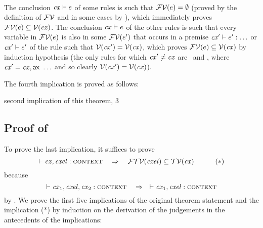 \begin{bycase}
\Case{\Rthsub}
\begin{derivation}
\steP{\efvar{\app{\tspred}{\expr}}=\efvar{\tspred}\cup\efvar{\expr}}
\step{\hastyO{\expr}{\typ}}{\premof{\Rthsub}}
\end{derivation}

\Case{\restrules}\\
The conclusion $\mathit{cx}\vdash e$ of some rules is such that
$\mathcal{FV}(e)=\emptyset$ (proved by the definition of $\mathcal{FV}$ and in some
cases by ), which immediately proves
$\mathcal{FV}(e)\subseteq\mathcal{V}(\mathit{cx})$. The conclusion $\mathit{cx}\vdash e$ of the
other rules is such that every variable in $\mathcal{FV}(e)$ is also in some
$\mathcal{FV}(e')$ that occurs in a premise $\mathit{cx}'\vdash e':\ldots$ or
$\mathit{cx}'\vdash e'$ of the rule such that $\mathcal{V}(\mathit{cx}')=\mathcal{V}(\mathit{cx})$, which
proves $\mathcal{FV}(e)\subseteq\mathcal{V}(\mathit{cx})$ by induction hypothesis (the only rules
for which $\mathit{cx}'\neq\mathit{cx}$ are \Rthifsbs\ and \Rthif, where
$\mathit{cx}'=\mathit{cx},\mathsf{ax}\ \ldots$ and so clearly $\mathcal{V}(\mathit{cx}')=\mathcal{V}(\mathit{cx})$).

\end{bycase}

The fourth implication is proved as follows:
\begin{derivation}
     {second implication of this theorem, 3}
\end{derivation}



\subsection*{Proof of }

To prove the last implication, it suffices to prove
\[
\cxwf{\snoc{\cx}{\cxel}}\ \ \IMPLIES\ \ \ftvar{\cxel}\subseteq\cxtvarO
\hspace{3em}(*)
\]
because
\[
\cxwf{\cx_1,\cxel,\cx_2}\ \ \IMPLIES\ \ \cxwf{\snoc{\cx_1}{\cxel}}
\]
by . We prove the first five implications of the original
theorem statement and the implication (*) by induction on the derivation of
the judgements in the antecedents of the implications:

